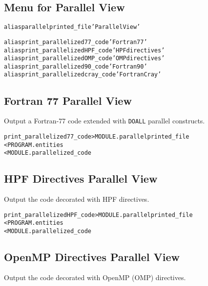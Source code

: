 \documentclass[a4paper]{report}
\newenvironment{PipsMake}{\begin{alltt}}{\end{alltt}}
\begin{document}
\subsection{Menu for Parallel View}

\begin{PipsMake}
alias parallelprinted_file 'Parallel View'

alias print_parallelized77_code 'Fortran 77'
alias print_parallelizedHPF_code 'HPF directives'
alias print_parallelizedOMP_code 'OMP directives'
alias print_parallelized90_code 'Fortran 90'
alias print_parallelizedcray_code 'Fortran Cray'
\end{PipsMake}


\subsection{Fortran 77 Parallel View}

Output a Fortran-77 code extended with {\tt DOALL} parallel constructs.

\begin{PipsMake}
print_parallelized77_code       > MODULE.parallelprinted_file
        < PROGRAM.entities
        < MODULE.parallelized_code
\end{PipsMake}



\subsection{HPF Directives Parallel View}

Output the code decorated with HPF directives.

\begin{PipsMake}
print_parallelizedHPF_code     > MODULE.parallelprinted_file
        < PROGRAM.entities
        < MODULE.parallelized_code
\end{PipsMake}


\subsection{OpenMP Directives Parallel View}

Output the code decorated with OpenMP (OMP) directives.
\end{document}
